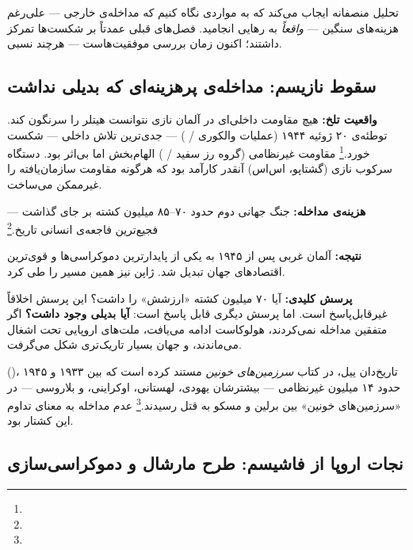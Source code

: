 تحلیل منصفانه ایجاب می‌کند که به مواردی نگاه کنیم که مداخله‌ی خارجی — علی‌رغم هزینه‌های سنگین — \textit{واقعاً} به رهایی انجامید. فصل‌های قبلی عمدتاً بر شکست‌ها تمرکز داشتند؛ اکنون زمان بررسی موفقیت‌هاست — هرچند نسبی.

\subsection{سقوط نازیسم: مداخله‌ی پرهزینه‌ای که بدیلی نداشت}
\label{subsec:ch15-nazi}

\begin{tcolorbox}[casebox, title={مطالعه‌ی موردی: شکست آلمان نازی (۱۹۳۹–۱۹۴۵)}]
\textbf{واقعیت تلخ:} هیچ مقاومت داخلی‌ای در آلمان نازی نتوانست هیتلر را سرنگون کند. توطئه‌ی ۲۰ ژوئیه ۱۹۴۴ (عملیات والکوری / ) — جدی‌ترین تلاش داخلی — شکست خورد.\footnote{} مقاومت غیرنظامی (گروه رز سفید / ) الهام‌بخش اما بی‌اثر بود. دستگاه سرکوب نازی (گشتاپو، اس‌اس) آنقدر کارآمد بود که هرگونه مقاومت سازمان‌یافته را غیرممکن می‌ساخت.

\textbf{هزینه‌ی مداخله:} جنگ جهانی دوم حدود ۷۰–۸۵ میلیون کشته بر جای گذاشت — فجیع‌ترین فاجعه‌ی انسانی تاریخ.\footnote{}

\textbf{نتیجه:} آلمان غربی پس از ۱۹۴۵ به یکی از پایدارترین دموکراسی‌ها و قوی‌ترین اقتصادهای جهان تبدیل شد. ژاپن نیز همین مسیر را طی کرد.

\textbf{پرسش کلیدی:} آیا ۷۰ میلیون کشته «ارزشش» را داشت؟ این پرسش اخلاقاً غیرقابل‌پاسخ است. اما پرسش دیگری قابل پاسخ است: \textbf{آیا بدیلی وجود داشت؟} اگر متفقین مداخله نمی‌کردند، هولوکاست ادامه می‌یافت، ملت‌های اروپایی تحت اشغال می‌ماندند، و جهان بسیار تاریک‌تری شکل می‌گرفت.
\end{tcolorbox}

 ()، تاریخ‌دان ییل، در کتاب \textit{سرزمین‌های خونین} مستند کرده است که بین ۱۹۳۳ و ۱۹۴۵ حدود ۱۴ میلیون غیرنظامی — بیشترشان یهودی، لهستانی، اوکراینی، و بلاروسی — در «سرزمین‌های خونین» بین برلین و مسکو به قتل رسیدند.\footnote{} عدم مداخله به معنای تداوم این کشتار بود.

\subsection{نجات اروپا از فاشیسم: طرح مارشال و دموکراسی‌سازی}
\label{subsec:ch15-marshall}

